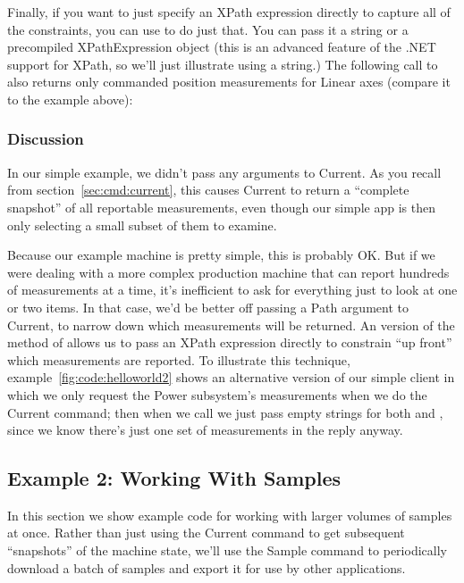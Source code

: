 Finally, if you want to just specify an XPath expression directly to
capture all of the constraints, you can use  to do
just that.  You can pass it a string or a precompiled XPathExpression
object 
(this is an advanced feature of the .NET support for XPath, so we'll
just illustrate using a string.)  The following call to
 also returns only commanded position measurements
for Linear axes (compare it to the example above):

\begin{quotation}
\end{quotation}

\subsubsection{Discussion}

In our simple example, we didn't pass any arguments to Current. As you
recall from section~\ref{sec:cmd:current}, this causes Current to return
a ``complete snapshot'' of all reportable measurements, even though our
simple app is then only selecting a small subset of them to examine.

Because our example machine is pretty simple, this is probably OK.  But
if we were dealing with a more complex production machine that can
report hundreds of measurements at a time, it's inefficient to ask for
everything just to look at one or two items.  In that case, we'd be
better off passing a Path argument to Current, to narrow down which
measurements will be returned.  An  version of the
 method of  allows us to pass an XPath
expression directly to constrain ``up front'' which measurements are
reported.  To illustrate this technique,
example~\ref{fig:code:helloworld2} shows an alternative version of our
simple client in which we only request the Power subsystem's
measurements when we do the Current command; then when we call
 we just pass empty strings for both
 and , since we know there's just one set of
measurements in the reply anyway.


\subsection{Example 2: Working With Samples}
\label{sec:example-samples}

In this section we show example code for working with larger volumes of
samples at once.  Rather than just using the Current command to get
subsequent ``snapshots'' of the machine state, we'll use the Sample
command to periodically download a batch of samples and export it for
use by other applications.


